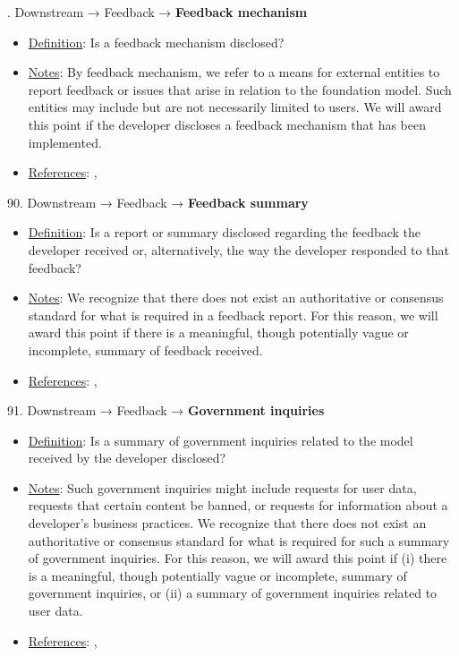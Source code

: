 . Downstream → Feedback → \textbf{Feedback mechanism}
\vspace{-\parskip}
\begin{itemize}
	\item
	\underline{Definition}: Is a feedback mechanism disclosed?
	\item
	\underline{Notes}: By feedback mechanism, we refer to a means for external entities to report feedback or issues that arise in relation to the foundation model. Such entities may include but are not necessarily limited to users. We will award this point if the developer discloses a feedback mechanism that has been implemented.
	\item
	\underline{References}: \citet{bommasani2023ecosystem}, \citet{raji2022audit}
\end{itemize}


90. Downstream → Feedback → \textbf{Feedback summary}
\vspace{-\parskip}
\begin{itemize}
	\item
	\underline{Definition}: Is a report or summary disclosed regarding the feedback the developer received or, alternatively, the way the developer responded to that feedback?
	\item
	\underline{Notes}: We recognize that there does not exist an authoritative or consensus standard for what is required in a feedback report. For this reason, we will award this point if there is a meaningful, though potentially vague or incomplete, summary of feedback received.
	\item
	\underline{References}: \citet{chen2021achieving}, \citet{piorkowski2022evaluating}
\end{itemize}


91. Downstream → Feedback → \textbf{Government inquiries}
\vspace{-\parskip}
\begin{itemize}
	\item
	\underline{Definition}: Is a summary of government inquiries related to the model received by the developer disclosed?
	\item
	\underline{Notes}: Such government inquiries might include requests for user data, requests that certain content be banned, or requests for information about a developer’s business practices. We recognize that there does not exist an authoritative or consensus standard for what is required for such a summary of government inquiries. For this reason, we will award this point if (i) there is a meaningful, though potentially vague or incomplete, summary of government inquiries, or (ii) a summary of government inquiries related to user data.
	\item
	\underline{References}: \citet{chou2012government}, \citet{bommasani2023ecosystem}
\end{itemize}


